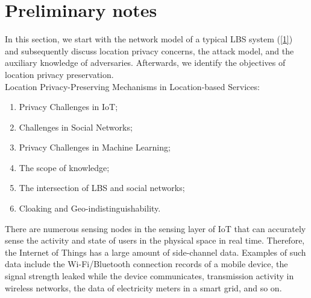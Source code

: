 \documentclass{acmart}
\begin{document}
\section{Preliminary notes}
In this section, we start with the network model of a typical LBS system (\ref{1}) and subsequently discuss location privacy concerns, the attack model, and the auxiliary knowledge of adversaries. Afterwards, we identify the objectives of location privacy preservation.
\\
Location Privacy-Preserving Mechanisms in Location-based Services:
\\
\begin{enumerate}
    \item Privacy Challenges in IoT;
    \item Challenges in Social Networks;
    \item Privacy Challenges in Machine Learning;
    \item The scope of knowledge;
    \item The intersection of LBS and social networks;
    \item Cloaking and Geo-indistinguishability.

\end{enumerate}
There are numerous sensing nodes in the sensing layer of IoT that can accurately sense the activity and state of users in the physical space in real time. Therefore, the Internet of Things has a large amount of side-channel data. Examples of such data include the Wi-Fi/Bluetooth connection records of a mobile device, the signal strength leaked while the device communicates, transmission activity in wireless networks, the data of electricity meters in a smart grid, and so on.
\end{document}
